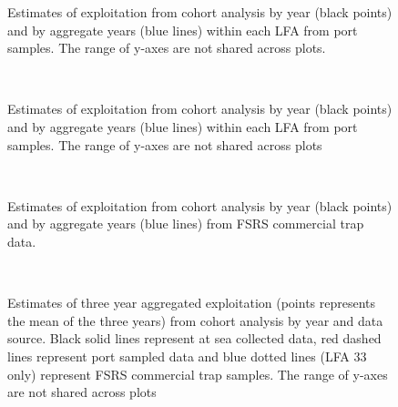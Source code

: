 \documentclass[11pt]{article}
\newcommand{\e}{/backup/bio_data/bio.lobster/figures/} %
\begin{document}
\begin{landscape}
\begin{figure}
                    \caption{Estimates of exploitation from cohort analysis by year (black points) and by aggregate years (blue lines) within each LFA from port samples. The range of y-axes are not shared across plots.}
        \end{figure}

\begin{figure}
        \centering
         \\
                     \caption{Estimates of exploitation from cohort analysis by year (black points) and by aggregate years (blue lines) within each LFA from port samples. The range of y-axes are not shared across plots}
        \end{figure}

\begin{figure}
        \centering
         \\
                     \caption{Estimates of exploitation from cohort analysis by year (black points) and by aggregate years (blue lines) from FSRS commercial trap data.}
        \end{figure}


\begin{figure}
        \centering
         \\
                    
                    \caption{Estimates of three year aggregated exploitation (points represents the mean of the three years) from cohort analysis by year and data source. Black solid lines represent at sea collected data, red dashed lines represent port sampled data and blue dotted lines (LFA 33 only) represent FSRS commercial trap samples. The range of y-axes are not shared across plots}
        \end{figure}



\end{landscape}
\end{document}
